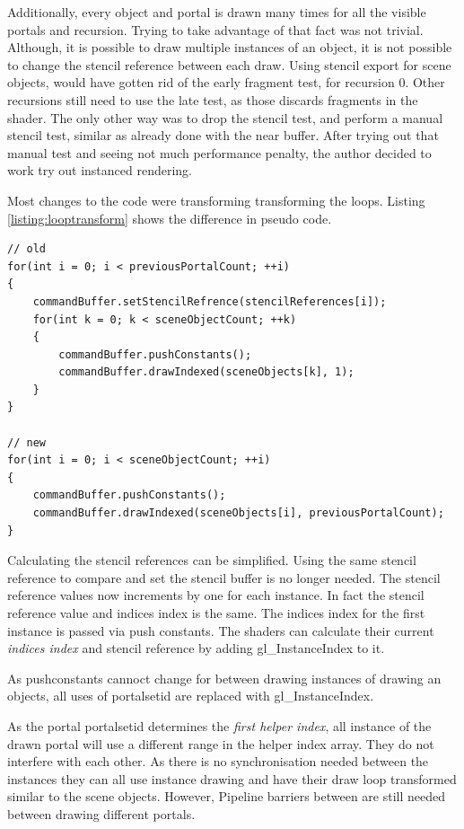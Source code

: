Additionally, every object and portal is drawn many times for all the visible portals and recursion. Trying to take advantage of that fact was not trivial. Although, it is possible to draw multiple instances of an object, it is not possible to change the stencil reference between each draw. Using stencil export for scene objects, would have gotten rid of the early fragment test, for recursion 0. Other recursions still need to use the late test, as those discards fragments in the shader. The only other way was to drop the stencil test, and perform a manual stencil test, similar as already done with the near buffer. After trying out that manual test and seeing not much performance penalty, the author decided to work try out instanced rendering.

Most changes to the code were transforming transforming the loops. Listing \ref{listing:looptransform} shows the difference in pseudo code.

\begin{lstlisting}[caption={Pseudocode Loop Transformation}, label=listing:looptransform]
// old 
for(int i = 0; i < previousPortalCount; ++i)
{
	commandBuffer.setStencilRefrence(stencilReferences[i]);
	for(int k = 0; k < sceneObjectCount; ++k)
	{
		commandBuffer.pushConstants();
		commandBuffer.drawIndexed(sceneObjects[k], 1);
	}
}

// new
for(int i = 0; i < sceneObjectCount; ++i)
{
	commandBuffer.pushConstants();
	commandBuffer.drawIndexed(sceneObjects[i], previousPortalCount);
}
\end{lstlisting}

Calculating the stencil references can be simplified. Using the same stencil reference to compare and set the stencil buffer is no longer needed. The stencil reference values now increments by one for each instance. In fact the stencil reference value and indices index is the same. The indices index for the first instance is passed via push constants. The shaders can calculate their current \textit{indices index} and stencil reference by adding gl\_InstanceIndex to it.

As pushconstants cannoct change for between drawing instances of drawing an objects, all uses of  \gls{portalsetid} are replaced with gl\_InstanceIndex.


As the portal \gls{portalsetid} determines the \textit{first helper index}, all instance of the drawn portal will use a different range in the helper index array. They do not interfere with each other. As there is no synchronisation needed between the instances they can all use instance drawing and have their draw loop transformed similar to the scene objects. However, Pipeline barriers between are still needed between drawing different portals.

